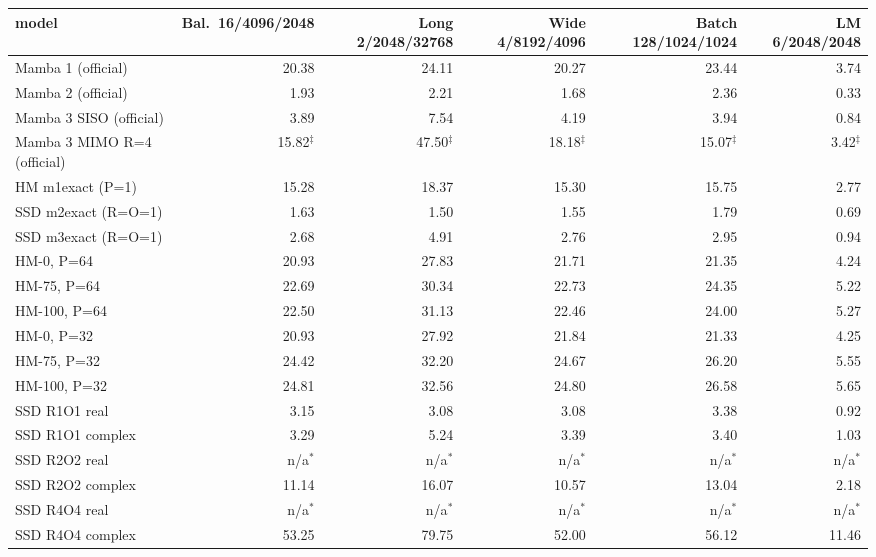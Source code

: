 \begin{tabular}{l r r r r r }
\toprule
model & Bal.\ 16/4096/2048 & Long 2/2048/32768 & Wide 4/8192/4096 & Batch 128/1024/1024 & LM 6/2048/2048 \\
\midrule
Mamba 1 (official) & 20.38 & 24.11 & 20.27 & 23.44 & 3.74 \\
Mamba 2 (official) & 1.93 & 2.21 & 1.68 & 2.36 & 0.33 \\
Mamba 3 SISO (official) & 3.89 & 7.54 & 4.19 & 3.94 & 0.84 \\
Mamba 3 MIMO R=4 (official) & 15.82$^\ddagger$ & 47.50$^\ddagger$ & 18.18$^\ddagger$ & 15.07$^\ddagger$ & 3.42$^\ddagger$ \\
HM m1exact (P=1) & 15.28 & 18.37 & 15.30 & 15.75 & 2.77 \\
SSD m2exact (R=O=1) & 1.63 & 1.50 & 1.55 & 1.79 & 0.69 \\
SSD m3exact (R=O=1) & 2.68 & 4.91 & 2.76 & 2.95 & 0.94 \\
HM-0, P=64 & 20.93 & 27.83 & 21.71 & 21.35 & 4.24 \\
HM-75, P=64 & 22.69 & 30.34 & 22.73 & 24.35 & 5.22 \\
HM-100, P=64 & 22.50 & 31.13 & 22.46 & 24.00 & 5.27 \\
HM-0, P=32 & 20.93 & 27.92 & 21.84 & 21.33 & 4.25 \\
HM-75, P=32 & 24.42 & 32.20 & 24.67 & 26.20 & 5.55 \\
HM-100, P=32 & 24.81 & 32.56 & 24.80 & 26.58 & 5.65 \\
SSD R1O1 real & 3.15 & 3.08 & 3.08 & 3.38 & 0.92 \\
SSD R1O1 complex & 3.29 & 5.24 & 3.39 & 3.40 & 1.03 \\
SSD R2O2 real & n/a$^\ast$ & n/a$^\ast$ & n/a$^\ast$ & n/a$^\ast$ & n/a$^\ast$ \\
SSD R2O2 complex & 11.14 & 16.07 & 10.57 & 13.04 & 2.18 \\
SSD R4O4 real & n/a$^\ast$ & n/a$^\ast$ & n/a$^\ast$ & n/a$^\ast$ & n/a$^\ast$ \\
SSD R4O4 complex & 53.25 & 79.75 & 52.00 & 56.12 & 11.46 \\
\bottomrule
\end{tabular}
